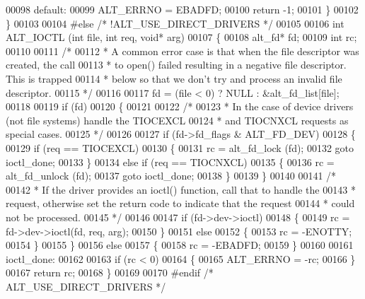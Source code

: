 \begin{DoxyCode}
00098     \textcolor{keywordflow}{default}:
00099         ALT_ERRNO = EBADFD;
00100         \textcolor{keywordflow}{return} -1;
00101     \}
00102 \}
00103 
00104 \textcolor{preprocessor}{#else }\textcolor{comment}{/* !ALT\_USE\_DIRECT\_DRIVERS */}\textcolor{preprocessor}{}
00105 
00106 \textcolor{keywordtype}{int} ALT_IOCTL (\textcolor{keywordtype}{int} file, \textcolor{keywordtype}{int} req, \textcolor{keywordtype}{void}* arg)
00107 \{
00108   alt_fd* fd;
00109   \textcolor{keywordtype}{int}     rc;
00110 
00111   \textcolor{comment}{/*}
00112 \textcolor{comment}{   * A common error case is that when the file descriptor was created, the call}
00113 \textcolor{comment}{   * to open() failed resulting in a negative file descriptor. This is trapped}
00114 \textcolor{comment}{   * below so that we don't try and process an invalid file descriptor.}
00115 \textcolor{comment}{   */}
00116 
00117   fd = (file < 0) ? NULL : &alt_fd_list[file];
00118   
00119   \textcolor{keywordflow}{if} (fd)
00120   \{
00121 
00122     \textcolor{comment}{/*}
00123 \textcolor{comment}{     * In the case of device drivers (not file systems) handle the TIOCEXCL}
00124 \textcolor{comment}{     * and TIOCNXCL requests as special cases.}
00125 \textcolor{comment}{     */}
00126 
00127     \textcolor{keywordflow}{if} (fd->fd_flags & ALT_FD_DEV)
00128     \{
00129       \textcolor{keywordflow}{if} (req == TIOCEXCL)
00130       \{
00131         rc = alt_fd_lock (fd);
00132         \textcolor{keywordflow}{goto} ioctl\_done;
00133       \}
00134       \textcolor{keywordflow}{else} \textcolor{keywordflow}{if} (req == TIOCNXCL)
00135       \{
00136         rc = alt_fd_unlock (fd);
00137         \textcolor{keywordflow}{goto} ioctl\_done;
00138       \}
00139     \}
00140 
00141     \textcolor{comment}{/*}
00142 \textcolor{comment}{     * If the driver provides an ioctl() function, call that to handle the}
00143 \textcolor{comment}{     * request, otherwise set the return code to indicate that the request}
00144 \textcolor{comment}{     * could not be processed.}
00145 \textcolor{comment}{     */}
00146    
00147     \textcolor{keywordflow}{if} (fd->dev->ioctl)
00148     \{
00149       rc = fd->dev->ioctl(fd, req, arg);
00150     \}
00151     \textcolor{keywordflow}{else}
00152     \{
00153       rc = -ENOTTY;
00154     \}
00155   \}
00156   \textcolor{keywordflow}{else}  
00157   \{
00158     rc = -EBADFD;
00159   \}
00160 
00161 ioctl\_done:
00162 
00163   \textcolor{keywordflow}{if} (rc < 0)
00164   \{
00165     ALT_ERRNO = -rc;
00166   \}
00167   \textcolor{keywordflow}{return} rc;
00168 \}
00169 
00170 \textcolor{preprocessor}{#endif }\textcolor{comment}{/* ALT\_USE\_DIRECT\_DRIVERS */}\textcolor{preprocessor}{}
\end{DoxyCode}
